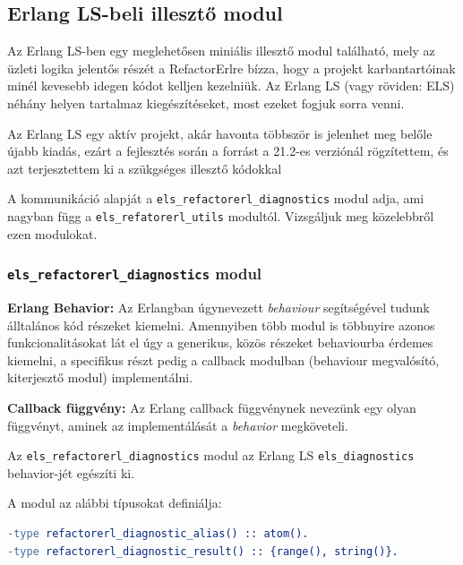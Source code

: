 \subsection{Erlang LS-beli illesztő modul}
Az Erlang LS-ben egy meglehetősen miniális illesztő modul található, mely az üzleti logika jelentős részét a RefactorErlre bízza, hogy a projekt karbantartóinak minél kevesebb idegen kódot kelljen kezelniük. Az Erlang LS (vagy röviden: ELS) néhány helyen tartalmaz kiegészítéseket, most ezeket fogjuk sorra venni.

Az Erlang LS egy aktív projekt, akár havonta többször is jelenhet meg belőle újabb kiadás, ezárt a fejlesztés során a forrást a 21.2-es verziónál rögzítettem, és azt terjesztettem ki a szükgséges illesztő kódokkal

A kommunikáció alapját a \lstinline{els_refactorerl_diagnostics} modul adja, ami nagyban függ a \lstinline{els_refatorerl_utils} modultól. Vizsgáljuk meg közelebbről ezen modulokat.

\subsubsection{\lstinline{els_refactorerl_diagnostics} modul}

\textbf{Erlang Behavior:} Az Erlangban úgynevezett \textit{behaviour} segítségével tudunk álltalános kód részeket kiemelni. Amennyiben több modul is többnyire azonos funkcionalitásokat lát el úgy a generikus, közös részeket behaviourba érdemes kiemelni, a specifikus részt pedig a callback modulban (behaviour megvalósító, kiterjesztő modul) implementálni.

\textbf{Callback függvény:} Az Erlang callback függvénynek nevezünk egy olyan függvényt, aminek az implementálását a \textit{behavior} megköveteli.


Az \lstinline{els_refactorerl_diagnostics} modul az Erlang LS \lstinline{els_diagnostics} behavior-jét egészíti ki. 

A modul az alábbi típusokat definiálja:

\begin{lstlisting}[language={erlang}]
-type refactorerl_diagnostic_alias() :: atom().
-type refactorerl_diagnostic_result() :: {range(), string()}.
\end{lstlisting}



